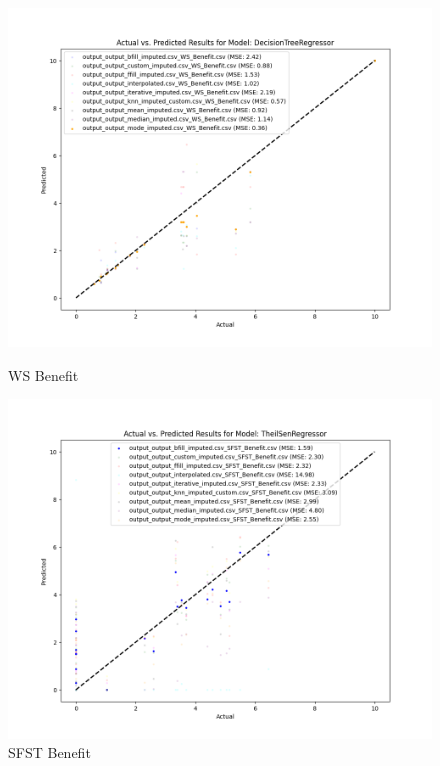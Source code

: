 \begin{figure}[H]
    \centering
    \begin{minipage}{0.495\textwidth}
        \centering
        \includegraphics[width=\linewidth]{reg_section_specific/images_reg_training/WS_Benefit_DecisionTreeRegressor_plot.png}
        \caption{WS Benefit}
        \label{fig_reg_spec:ws_ben_reg_training}
    \end{minipage}\hfill
    \begin{minipage}{0.495\textwidth}
        \centering
        \includegraphics[width=\linewidth]{reg_section_specific/images_reg_training/SFST_Benefit_TheilSenRegressor_plot.png}
        \caption{SFST Benefit}
        \label{fig_reg_spec:sfst_ben_reg_training}
    \end{minipage}
\end{figure}